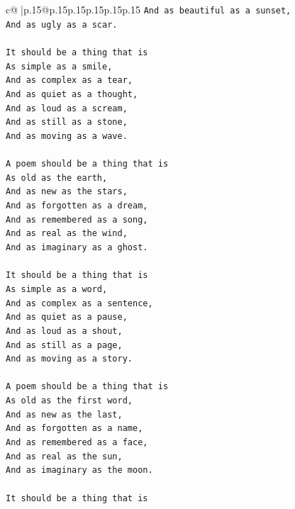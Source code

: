 \documentclass{article}
\begin{document}
{\begin{supertabular}{c@{$\;$}|p{.15\linewidth}@{}p{.15\linewidth}p{.15\linewidth}p{.15\linewidth}p{.15\linewidth}p{.15\linewidth}}
{{{\texttt{And as beautiful as a sunset,} \\
\texttt{And as ugly as a scar.} \\
\\ 
\texttt{It should be a thing that is} \\
\texttt{As simple as a smile,} \\
\texttt{And as complex as a tear,} \\
\texttt{And as quiet as a thought,} \\
\texttt{And as loud as a scream,} \\
\texttt{And as still as a stone,} \\
\texttt{And as moving as a wave.} \\
\\ 
\texttt{A poem should be a thing that is} \\
\texttt{As old as the earth,} \\
\texttt{And as new as the stars,} \\
\texttt{And as forgotten as a dream,} \\
\texttt{And as remembered as a song,} \\
\texttt{And as real as the wind,} \\
\texttt{And as imaginary as a ghost.} \\
\\ 
\texttt{It should be a thing that is} \\
\texttt{As simple as a word,} \\
\texttt{And as complex as a sentence,} \\
\texttt{And as quiet as a pause,} \\
\texttt{And as loud as a shout,} \\
\texttt{And as still as a page,} \\
\texttt{And as moving as a story.} \\
\\ 
\texttt{A poem should be a thing that is} \\
\texttt{As old as the first word,} \\
\texttt{And as new as the last,} \\
\texttt{And as forgotten as a name,} \\
\texttt{And as remembered as a face,} \\
\texttt{And as real as the sun,} \\
\texttt{And as imaginary as the moon.} \\
\\ 
\texttt{It should be a thing that is} \\
}}}
\end{supertabular}}
\end{document}
